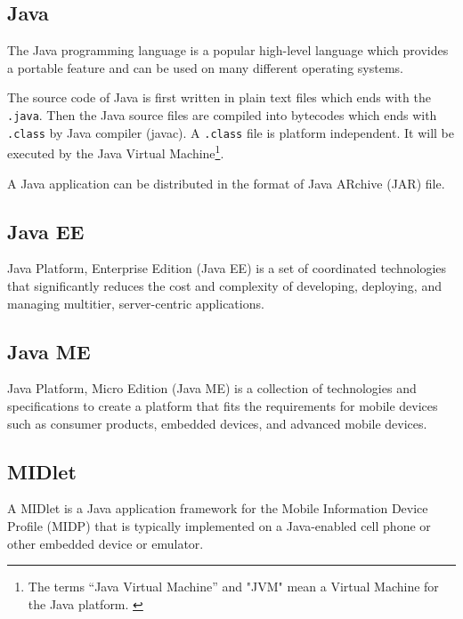 \subsection*{Java}
\label{sec:Java}

The Java\texttrademark{} programming language is a popular high-level language which provides a portable feature and can be used on many different operating systems. 

The source code of Java is first written in plain text files which ends with the \nolinebreak\texttt{.java}. Then the Java source files are compiled into bytecodes which ends with \nolinebreak\texttt{.class} by Java compiler (javac). A \nolinebreak\texttt{.class} file is platform independent. It will be executed by the Java Virtual Machine\label{sym:JVM}\footnote{The terms ``Java Virtual Machine'' and "JVM" mean a Virtual Machine for the Java platform. \cite{TheJavaProgrammingLanguage}}.\cite{TheJavaProgrammingLanguage}

A Java application can be distributed in the format of Java ARchive (JAR\label{sym:JAR}) file.

\subsection*{Java EE}
\label{sec:JavaEE}
\label{sym:JavaEE}

Java Platform, Enterprise Edition (Java EE) is a set of coordinated technologies that significantly reduces the cost and complexity of developing, deploying, and managing multitier, server-centric applications.\cite{JavaEETechnology}


\subsection*{Java ME}
\label{sec:JavaME}
\label{sym:JavaME}

Java Platform, Micro Edition (Java ME) is a collection of technologies and specifications to create a platform that fits the requirements for mobile devices such as consumer products, embedded devices, and advanced mobile devices.\cite{JavaMETechnology}

\subsection*{MIDlet}
\label{sec:MIDlet}
\label{sym:MIDlet}

A MIDlet is a Java application framework for the Mobile Information Device Profile (MIDP\label{sym:MIDP}) that is typically implemented on a Java-enabled cell phone or other embedded device or emulator.

